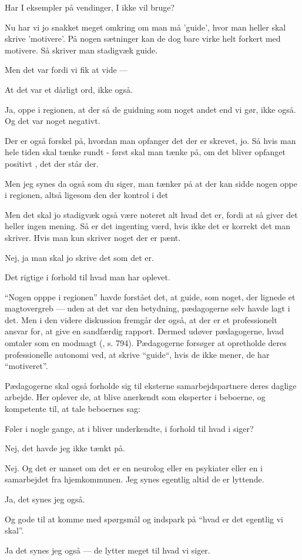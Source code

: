 \begin{description}
\MAA
Har I eksempler på vendinger, I ikke vil bruge?

\AMB
Nu har vi jo snakket meget omkring om man må 'guide', hvor man heller skal skrive 'motivere'.
På nogen sætninger kan de dog bare virke helt forkert med motivere.
Så skriver man stadigvæk guide.

\DMC
Men det var fordi vi fik at vide ---

\AMB
At det var et dårligt ord, ikke også.

\DMC
Ja, oppe i regionen, at der så de guidning som noget andet end vi gør, ikke også.
Og det var noget negativt.

\AMB
Der er også forskel på, hvordan man opfanger det der er skrevet, jo.
Så hvis man hele tiden skal tænke rundt - først skal man tænke på, om det bliver opfanget positivt , det der står der.

\DMC
Men jeg synes da også som du siger, man tænker på at der kan sidde nogen oppe i regionen, altså ligesom den der kontrol i det

\AMB
Men det skal jo stadigvæk også være noteret alt hvad det er, fordi at så giver det heller ingen mening.
Så er det ingenting værd, hvis ikke det er korrekt det man skriver.
Hvis man kun skriver noget der er pænt.

\DMC
Nej, ja man skal jo skrive det som det er.

\AMB
Det rigtige i forhold til hvad man har oplevet.
\end{description}
“Nogen opppe i regionen” havde forstået det, at guide, som noget, der lignede et magtovergreb — uden at det var den betydning, pædagogerne selv havde lagt i det.
Men i den videre diskussion fremgår der også, at der er et professionelt ansvar for, at give en sandfærdig rapport.
Dermed udøver pædagogerne, hvad \citeauthor{foucaultSubjectPower1982} omtaler som en modmagt (\citeyear{foucaultSubjectPower1982},         s. 794).
Pædagogerne forsøger at opretholde deres professionelle autonomi ved, at skrive “guide“, hvis de ikke mener, de har “motiveret”.

Pædagogerne skal også forholde sig til eksterne samarbejdspartnere deres daglige arbejde.
Her oplever de, at blive anerkendt som eksperter i beboerne, og kompetente til, at tale beboernes sag:
\begin{description}
\MAA
Føler i nogle gange, at i bliver underkendte, i forhold til hvad i siger?

\DMC
Nej, det havde jeg ikke tænkt på.

\AMB
Nej. Og det er uanset om det er en neurolog eller en psykiater eller en i samarbejdet fra hjemkommunen.
Jeg synes egentlig altid de er lyttende.

\DMC
Ja, det synes jeg også.

\AMB
Og gode til at komme med spørgsmål og indspark på “hvad er det egentlig vi skal”.

\DMC
Ja det synes jeg også — de lytter meget til hvad vi siger.
\end{description}

